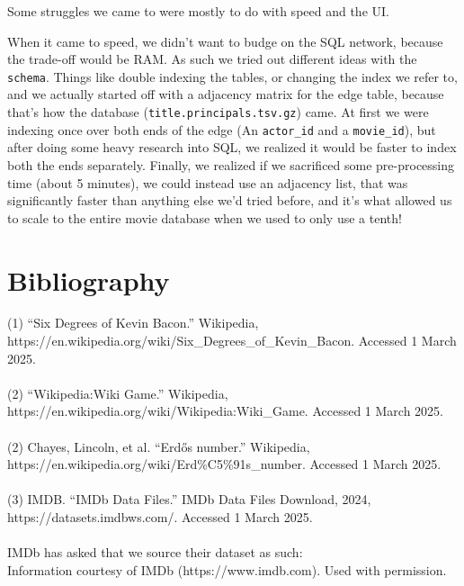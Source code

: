 \documentclass{article}
\begin{document}
Some struggles we came to were mostly to do with speed and the UI. 

When it came to speed, we didn't want to budge on the SQL network, because the trade-off would be RAM. As such we tried out different ideas with the \verb!schema!. Things like double indexing the tables, or changing the index we refer to, and we actually started off with a adjacency matrix for the edge table, because that's how the database (\verb!title.principals.tsv.gz!) came. At first we were indexing once over both ends of the edge (An \verb!actor_id! and a \verb!movie_id!), but after doing some heavy research into SQL, we realized it would be faster to index both the ends separately. Finally, we realized if we sacrificed some pre-processing time (about 5 minutes), we could instead use an adjacency list, that was significantly faster than anything else we'd tried before, and it's what allowed us to scale to the entire movie database when we used to only use a tenth!

\section{Bibliography}

(1) “Six Degrees of Kevin Bacon.” Wikipedia, https://en.wikipedia.org/wiki/Six\_Degrees\_of\_Kevin\_Bacon. Accessed 1 March 2025.\\\\

(2) “Wikipedia:Wiki Game.” Wikipedia, https://en.wikipedia.org/wiki/Wikipedia:Wiki\_Game. Accessed 1 March 2025.\\\\

(2) Chayes, Lincoln, et al. “Erdős number.” Wikipedia, https://en.wikipedia.org/wiki/Erd\%C5\%91s\_number. Accessed 1 March 2025.\\\\

(3) IMDB. “IMDb Data Files.” IMDb Data Files Download, 2024, https://datasets.imdbws.com/. Accessed 1 March 2025.\\\\



IMDb has asked that we source their dataset as such:\\
Information courtesy of
IMDb
(https://www.imdb.com).
Used with permission.
\end{document}
